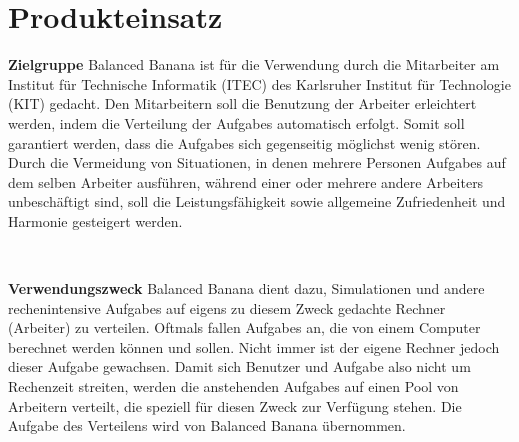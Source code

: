 \documentclass[a4paper,12pt]{article}
\begin{document}
\section{Produkteinsatz}
\begin{itemize}
\begin{minipage}[t]{\linewidth}
\item \textbf{Zielgruppe}\newline
Balanced Banana ist für die Verwendung durch die Mitarbeiter am Institut für Technische Informatik (ITEC) des Karlsruher Institut für Technologie (KIT) gedacht.\newline
Den Mitarbeitern soll die Benutzung der \gls{Arbeiter} erleichtert werden, indem die Verteilung der \glspl{Aufgabe} automatisch erfolgt. Somit soll garantiert werden, dass die \glspl{Aufgabe} sich gegenseitig möglichst wenig stören.\newline
Durch die Vermeidung von Situationen, in denen mehrere Personen \glspl{Aufgabe} auf dem selben \gls{Arbeiter} ausführen, während einer oder mehrere andere \glspl{Arbeiter} unbeschäftigt sind, soll die Leistungsfähigkeit sowie allgemeine Zufriedenheit und Harmonie gesteigert werden.
\end{minipage}
\\

\begin{minipage}[t]{\linewidth}
\item \textbf{Verwendungszweck}\newline
Balanced Banana dient dazu, Simulationen und andere rechenintensive \glspl{Aufgabe} auf eigens zu diesem Zweck gedachte Rechner (\gls{Arbeiter}) zu verteilen.\newline
Oftmals fallen \glspl{Aufgabe} an, die von einem Computer berechnet werden können und sollen. Nicht immer ist der eigene Rechner jedoch dieser \gls{Aufgabe} gewachsen. Damit sich \gls{Benutzer} und \gls{Aufgabe} also nicht um Rechenzeit streiten, werden die anstehenden \glspl{Aufgabe} auf einen Pool von Arbeitern verteilt, die speziell für diesen Zweck zur Verfügung stehen. Die Aufgabe des Verteilens wird von Balanced Banana übernommen.
\end{minipage}
\\


\end{itemize}
\end{document}
